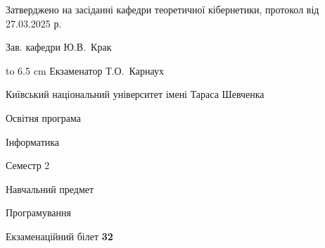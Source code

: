 \documentclass[12pt, ukrainian]{article}
\begin{document}
{\smallskip\smallskip \begin {scriptsize} Затверджено на засіданні кафедри теоретичної кібернетики, протокол   від   27.03.2025 р.\par\smallskip\smallskip\smallskip\smallskip
{\parbox {6.5 cm} {Зав. кафедри \dotfill Ю.В.~Крак}}\hspace {0.7cm} {\hbox to 6.5 cm { Екзаменатор \dotfill Т.О.~Карнаух}} \end{scriptsize}}
\newpage
{{\begin {scriptsize}\par
{ \center  Київський національний університет імені Тараса Шевченка \par}
{\parbox {5 cm}{Освітня програма \hfill}{\parbox {7 cm}{Інформатика\hfill}}\parbox {6 cm}{\hfill Семестр 2}}\par
{\parbox {5 cm} {Навчальний предмет \hfill}\parbox {7 cm}{Програмування \hfill}\parbox {6cm}{\hfill}\par}\vspace{-15pt} \end{scriptsize}}{\center Екзаменаційний білет \No \textbf { 32 }\par}}
\end{document}
